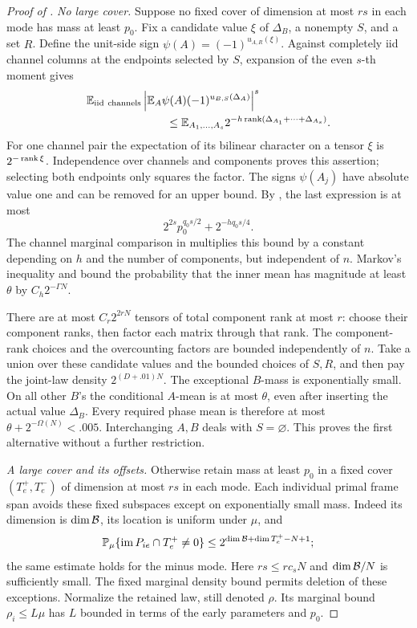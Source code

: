 \begin{proof}[Proof of ]
\medskip\noindent
\emph{No large cover.}
Suppose no fixed cover of dimension at most \(rs\) in each mode
has mass at least \(p_0\).  Fix a candidate value \(\xi\) of
\(\Delta_B\), a nonempty \(S\), and a set \(R\).  Define the
unit-side sign \(\psi(A)=(-1)^{u_{A,R}(\xi)}\).  Against completely
iid channel columns at the endpoints selected by \(S\), expansion
of the even \(s\)-th moment gives
\begin{align}
 &\E_{\mathrm{iid\ channels}}
 \left|\E_A\psi(A)(-1)^{u_{B,S}(\Delta_A)}\right|^s
 \notag\\
 &\hspace{25mm}\le
 \E_{A_1,\ldots,A_s}
       2^{-h\rank(\Delta_{A_1}+\cdots+\Delta_{A_s})}.
 \label{eq:phase-moment}
\end{align}
For one channel pair the expectation of its bilinear character
on a tensor \(\xi\) is \(2^{-\operatorname{rank}\xi}\).  Independence over
channels and components proves this assertion; selecting both
endpoints only squares the factor.  The signs \(\psi(A_j)\)
have absolute value one and can be removed for an upper bound.
By , the last expression is at most
\[
 2^{2s}p_0^{q_0s/2}+2^{-hq_0s/4}.
\]
The channel marginal comparison in 
multiplies this bound by a constant depending on \(h\) and the
number of components, but independent of \(n\).
Markov's inequality and
 bound the probability that
the inner mean has magnitude at least \(\theta\) by
\(C_h2^{-\Gamma N}\).

There are at most \(C_r2^{2rN}\) tensors of total component rank
at most \(r\): choose their component ranks, then factor each
matrix through that rank.  The component-rank choices and the
overcounting factors are bounded independently of \(n\).
Take a union over these candidate values and the bounded choices
of \(S,R\), and then pay the joint-law density
\(2^{(D+.01)N}\).  The exceptional \(B\)-mass is exponentially
small.  On all other \(B\)'s the conditional \(A\)-mean is at most
\(\theta\), even after inserting the actual value \(\Delta_B\).
Every required phase mean is therefore at most
\(\theta+2^{-\Omega(N)}<.005\).  Interchanging \(A,B\) deals
with \(S=\varnothing\).  This proves the first alternative
without a further restriction.

\medskip\noindent
\emph{A large cover and its offsets.}
Otherwise retain mass at least \(p_0\) in a fixed cover
\((T_e^+,T_e^-)\) of dimension at most \(rs\) in each mode.
Each individual primal frame span avoids these fixed subspaces
except on exponentially small mass.  Indeed its dimension is
\(\dim\mathcal B\), its location is uniform under \(\mu\), and
\[
 \mathbb P_\mu\{\operatorname{im} P_{ie}\cap T_e^+\ne0\}
 \le 2^{\dim\mathcal B+\dim T_e^+-N+1};
\]
the same estimate holds for the minus mode.  Here
\(rs\le rc_sN\) and \(\dim\mathcal B/N\) is sufficiently small.
The fixed marginal density bound permits deletion of these
exceptions.  Normalize the retained law, still denoted \(\rho\).
Its marginal bound \(\rho_i\le L\mu\) has \(L\) bounded in terms
of the early parameters and \(p_0\).


\end{proof}
